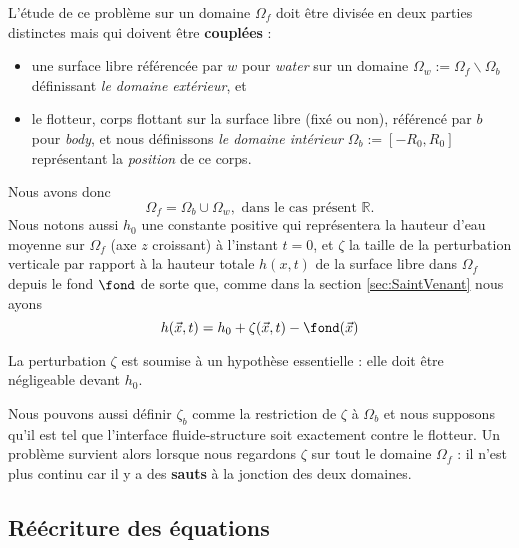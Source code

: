 \noindent L'étude de ce problème sur un domaine $\Omega_f$ doit être divisée en deux parties distinctes mais qui doivent être \textbf{couplées} : 
\begin{itemize}
	\item une surface libre référencée par $w$ pour \textit{water} sur un domaine $\Omega_w := \Omega_f\backslash \Omega_b$ définissant \textit{le domaine extérieur}, et 
	\item le flotteur, corps flottant sur la surface libre (fixé ou non), référencé par $b$ pour \textit{body}, et nous définissons \textit{le domaine intérieur} $\Omega_b := [-R_0, R_0]$ représentant la \textit{position} de ce corps.\\
\end{itemize}
Nous avons donc \[\Omega_f = \Omega_b \cup \Omega_w,\text{ dans le cas présent $\mathbb{R}$.}\]
Nous notons aussi $h_0$ une constante positive qui représentera la hauteur d'eau moyenne sur $\Omega_f$ (axe $z$ croissant) à l'instant $t=0$, et $\zeta$ la taille de la perturbation verticale par rapport à la hauteur totale $h(x, t)$ de la surface libre dans $\Omega_f$ depuis le fond $\fond$ de sorte que, comme dans la section \ref{sec:SaintVenant} nous ayons
\begin{equation}
	h(\vec{x}, t) = h_0 + \zeta(\vec{x}, t) - \fond (\vec{x}) \label{eq:deep}
\end{equation}\vspace{-5mm}
\begin{refe}
La perturbation $\zeta$ est soumise à un hypothèse essentielle : elle doit être négligeable devant $h_0$.
\end{refe}
Nous pouvons aussi définir $\zeta_b$ comme la restriction de $\zeta$ à $\Omega_b$ et nous supposons qu'il est tel que l'interface fluide-structure soit exactement contre le flotteur. Un problème survient alors lorsque nous regardons $\zeta$ sur tout le domaine $\Omega_f$ : il n'est plus continu car il y a des \textbf{sauts} à la jonction des deux domaines.\\

\subsection{Réécriture des équations}

